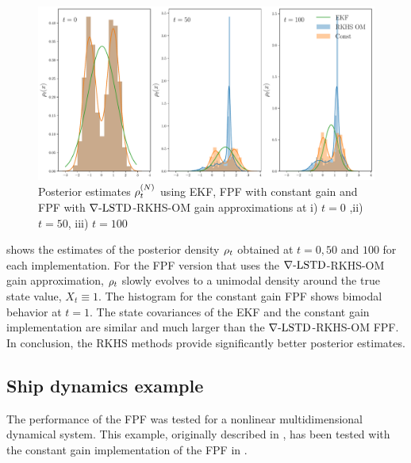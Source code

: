 \begin{figure}[htbp]
	\includegraphics[width = 6in] {images/Chap4_Posterior_estimate}
	\caption{ Posterior estimates $\rho_t^{(N)}$ using EKF, FPF with constant gain and FPF with $\nabla\text{-LSTD}$-RKHS-OM gain approximations at i) $t=0$ ,ii) $t = 50$, iii) $t = 100$}
	\label{fig:posterior_estimate}
\end{figure}

 shows the estimates of the posterior density $\rho_t$ obtained at $t=0,50$ and $100$ for each implementation.  For the FPF version that uses the $\nabla\text{-LSTD}$-RKHS-OM gain approximation, $\rho_t$ slowly evolves to a unimodal density around the true state value, $X_t \equiv 1$. The histogram for the constant gain FPF shows bimodal behavior at $t=1$.  The state covariances of the EKF and the constant gain implementation are similar and much larger than the $\nabla\text{-LSTD}$-RKHS-OM FPF. In conclusion, the RKHS methods provide significantly better posterior estimates.


\subsection{Ship dynamics example} 
\label{s:ship_dynamics}
The performance of the FPF was tested for a nonlinear multidimensional dynamical system. This example, originally described in \cite{budchelee07}, has been tested with the constant gain implementation of the FPF in \cite{tilghiomeh13}.

